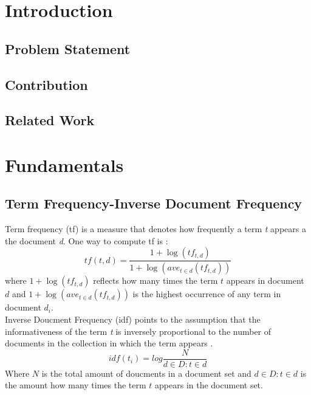 \documentclass[a4paper, 11pt,titlepage,oneside,openany]{book}
\begin{document}
\chapter{Introduction}

\section{Problem Statement}
 
 

\section{Contribution}

 

\section{Related Work}

\chapter{Fundamentals}

\section{Term Frequency-Inverse Document Frequency}
Term frequency (\gls{tf}) is a measure that denotes how frequently a term \textit{t} appears a the document \textit{d}. One way to compute \gls{tf} is \cite{IR-book}:\\
\[
tf(t,d)=\frac{1+\log(tf_{t,d})}{1+\log(ave_{t\in d}(tf_{t,d}))}
\]
where $1+\log(tf_{t,d})$ reflects how many times the term $t$ appears in document $d$ and $1+\log(ave_{t\in d}(tf_{t,d}))$ is the highest occurrence of any term in document $d_i$.\\

\noindent Inverse Doucment Frequency (\gls{idf}) points to the assumption that the informativeness of the term \textit{t} is inversely proportional to the number of documents in the collection in which the term appears \cite{IR-book}.\\
\[
idf(t_i)=log\frac{N}{d \in D : t \in d}
\]
Where $N$ is the total amount of doucments in a document set and $d \in D : t \in d$ is the amount how many times the term $t$ appears in the document set.\\
\end{document}
